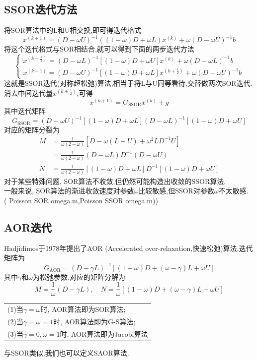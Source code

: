 \documentclass[12pt,a4paper]{article}
\begin{document}
\subsection{\color{blue}SSOR迭代方法}
将SOR算法中的L和U相交换,即可得迭代格式
$$
x^{(k+1)}=(D-\omega U)^{-1}((1-\omega) D+\omega L) x^{(k)}+\omega(D-\omega U)^{-1} b
$$
将这个迭代格式与SOR相结合,就可以得到下面的两步迭代方法
$$
\left\{\begin{array}{l}{x^{\left(k+\frac{1}{2}\right)}=(D-\omega L)^{-1}[(1-\omega) D+\omega U] x^{(k)}+\omega(D-\omega L)^{-1} b} \\ {x^{(k+1)}=(D-\omega U)^{-1}[(1-\omega) D+\omega L] x^{\left(k+\frac{1}{2}\right)}+\omega(D-\omega U)^{-1} b}\end{array}\right.
$$
这就是{\color{blue}SSOR迭代}(对称超松弛)算法,相当于将L与U同等看待,交替做两次SOR迭代.\\
消去中间迭代量$x^{(k+\frac{1}{2})}$,可得
$$
x^{(k+1)}=G_{\mathrm{SSOR}} x^{(k)}+g
$$
其中迭代矩阵
$$
G_{\mathrm{SSOR}}=(D-\omega U)^{-1}[(1-\omega) D+\omega L](D-\omega L)^{-1}[(1-\omega) D+\omega U]
$$
对应的矩阵分裂为
$$
\begin{aligned} M &=\frac{1}{\omega(2-\omega)}\left[D-\omega(L+U)+\omega^{2} L D^{-1} U\right] \\ &=\frac{1}{\omega(2-\omega)}(D-\omega L) D^{-1}(D-\omega U) \\ N &=\frac{1}{\omega(2-\omega)}[(1-\omega) D+\omega L] D^{-1}[(1-\omega) D+\omega U] \end{aligned}
$$
对于某些特殊问题, SOR算法不收敛,但仍然可能构造出收敛的SSOR算法.\\
一般来说, SOR算法的渐进收敛速度对参数$\omega$比较敏感,但SSOR对参数$\omega$不太敏感.\\
({\color{blue} Poisson SOR omega.m,Poisson SSOR omega.m)})\\
\subsection{\color{blue}AOR迭代}
Hadjidimos于1978年提出了AOR (Accelerated over-relaxation,快速松弛)算法,迭代矩阵为
$$
G_{\mathrm{AOR}}=(D-\gamma L)^{-1}[(1-\omega) D+(\omega-\gamma) L+\omega U]
$$
其中$\gamma$和$\omega$为松弛参数.对应的矩阵分解为
$$
M=\frac{1}{\omega}(D-\gamma L), \quad N=\frac{1}{\omega}[(1-\omega) D+(\omega-\gamma) L+\omega U]
$$
\begin{tabular}{l}
\qquad  (1)当$\gamma=\omega$时, AOR算法即为SOR算法;\\
\qquad  (2)当$\gamma=\omega=1$时, AOR算法即为G-S算法;\\
\qquad  (3)当$\gamma=0,\omega=1$时, AOR算法即为Jacobi算法
\end{tabular}
与SSOR类似,我们也可以定义SAOR算法.
\end{document}
